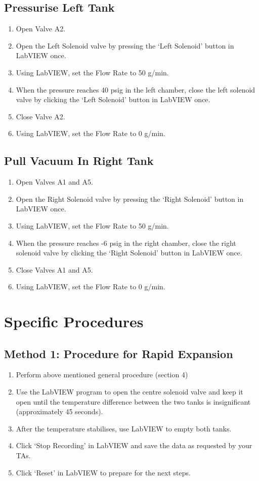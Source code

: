 \documentclass[titlepage, twocolumn, 12pt]{article}
\begin{document}
\subsection{Pressurise Left Tank}
\begin{enumerate}
    \item Open Valve A2.
    \item Open the Left Solenoid valve by pressing the ‘Left Solenoid’ button in LabVIEW once.
    \item Using LabVIEW, set the Flow Rate to 50 g/min.
    \item When the pressure reaches 40 psig in the left chamber, close the left solenoid valve by clicking the ‘Left Solenoid’ button in LabVIEW once.
    \item Close Valve A2.
    \item Using LabVIEW, set the Flow Rate to 0 g/min.
\end{enumerate}
\subsection{Pull Vacuum In Right Tank}
\begin{enumerate}
    \item Open Valves A1 and A5.
    \item Open the Right Solenoid valve by pressing the ‘Right Solenoid’ button in LabVIEW once.
    \item Using LabVIEW, set the Flow Rate to 50 g/min.
    \item When the pressure reaches -6 psig in the right chamber, close the right solenoid valve by clicking the ‘Right Solenoid’ button in LabVIEW once.
    \item Close Valves A1 and A5.
    \item Using LabVIEW, set the Flow Rate to 0 g/min.
\end{enumerate}

\section{Specific Procedures}

\subsection{Method 1: Procedure for Rapid Expansion}

\begin{enumerate}
    \item Perform above mentioned general procedure (section 4)
    \item Use the LabVIEW program to open the centre solenoid valve and keep it open until the temperature difference between the two tanks is insignificant (approximately 45 seconds).
    \item After the temperature stabilises, use LabVIEW to empty both tanks.
    \item Click ‘Stop Recording’ in LabVIEW and save the data as requested by your TAs.
    \item Click ‘Reset’ in LabVIEW to prepare for the next steps.
\end{enumerate}
\end{document}
